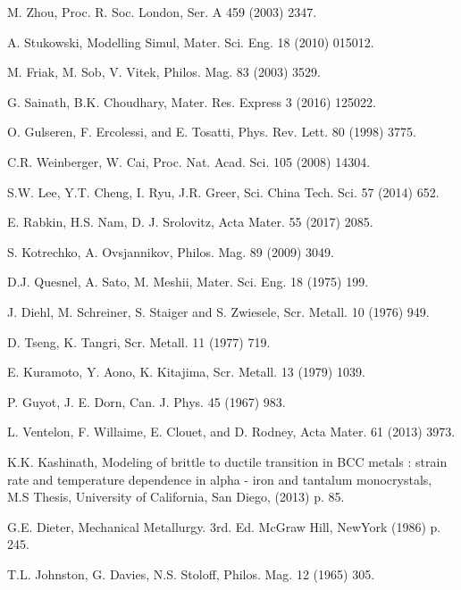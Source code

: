 \documentclass[%
reprint,%
 amssymb, amsmath,%
 aip,apl,%
]{revtex4-1}
\begin{document}
\begin{thebibliography}{99}
 M. Zhou, Proc. R. Soc. London, Ser. A 459 (2003) 2347.


 A. Stukowski, Modelling Simul, Mater. Sci. Eng. 18 (2010) 015012.

 M. Friak, M. Sob, V. Vitek, Philos. Mag. 83 (2003) 3529.

 G. Sainath, B.K. Choudhary, Mater. Res. Express 3 (2016) 125022.

 O. Gulseren, F. Ercolessi, and E. Tosatti, Phys. Rev. Lett. 80 (1998) 3775.

 C.R. Weinberger, W. Cai, Proc. Nat. Acad. Sci. 105 (2008) 14304. 


 S.W. Lee, Y.T. Cheng, I. Ryu, J.R. Greer, Sci. China Tech. Sci. 57 (2014) 652.

 E. Rabkin, H.S. Nam, D. J. Srolovitz, Acta Mater. 55 (2017) 2085.

 S. Kotrechko, A. Ovsjannikov, Philos. Mag. 89 (2009) 3049.

 D.J. Quesnel, A. Sato, M. Meshii, Mater. Sci. Eng. 18 (1975) 199.

 J. Diehl, M. Schreiner, S. Staiger and S. Zwiesele, Scr. Metall. 10 (1976) 949.

 D. Tseng, K. Tangri, Scr. Metall. 11 (1977) 719.

 E. Kuramoto, Y. Aono, K. Kitajima, Scr. Metall. 13 (1979) 1039.

 P. Guyot, J. E. Dorn, Can. J. Phys. 45 (1967) 983.

 L. Ventelon, F. Willaime, E. Clouet, and D. Rodney, Acta Mater. 61 (2013) 3973.


 K.K. Kashinath, Modeling of brittle to ductile transition in BCC metals : strain rate and 
temperature dependence in alpha - iron and tantalum monocrystals, M.S Thesis, University of California, San 
Diego, (2013) p. 85.

 G.E. Dieter, Mechanical Metallurgy. 3rd. Ed. McGraw Hill, NewYork (1986) p. 245.

 T.L. Johnston, G. Davies, N.S. Stoloff, Philos. Mag. 12 (1965) 305.



\end{thebibliography}
\end{document}
